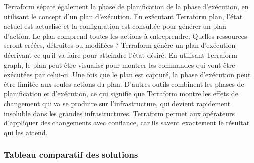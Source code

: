 \documentclass[]{article}
\begin{document}
Terraform sépare également la phase de planification de la phase
d'exécution, en utilisant le concept d'un plan d'exécution. En exécutant
Terraform plan, l'état actuel est actualisé et la configuration est
consultée pour générer un plan d'action. Le plan comprend toutes les
actions à entreprendre. Quelles ressources seront créées, détruites ou
modifiées ? Terraform génère un plan d'exécution décrivant ce qu'il va
faire pour atteindre l'état désiré. En utilisant Terraform graph, le
plan peut être visualisé pour montrer les commandes qui vont être
exécutées par celui-ci. Une fois que le plan est capturé, la phase
d'exécution peut être limitée aux seules actions du plan. D'autres
outils combinent les phases de planification et d'exécution, ce qui
signifie que Terraform montre les effets de changement qui va se
produire sur l'infrastructure, qui devient rapidement insoluble dans les
grandes infrastructures. Terraform permet aux opérateurs d'appliquer des
changements avec confiance, car ils savent exactement le résultat qui les attend.

\subsubsection{Tableau comparatif des solutions}

\newpage
\end{document}
